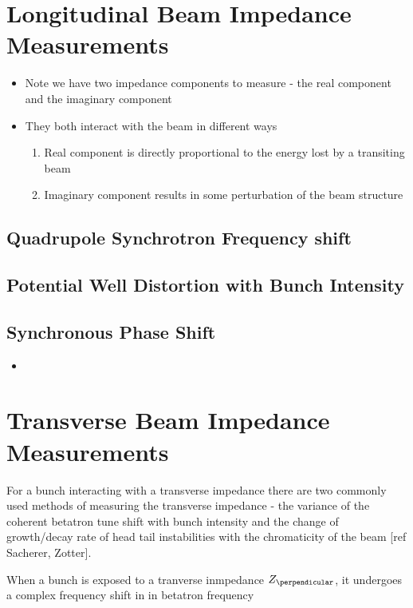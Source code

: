 \section{Longitudinal Beam Impedance Measurements}

\begin{itemize}
\item{Note we have two impedance components to measure - the real component and the imaginary component}
\item{They both interact with the beam in different ways}
\begin{enumerate}
\item{Real component is directly proportional to the energy lost by a transiting beam}
\item{Imaginary component results in some perturbation of the beam structure}
\end{enumerate}
\end{itemize}

\subsection{Quadrupole Synchrotron Frequency shift}

\subsection{Potential Well Distortion with Bunch Intensity}



\subsection{Synchronous Phase Shift}
\begin{itemize}
\item{}
\end{itemize}

\section{Transverse Beam Impedance Measurements}

For a bunch interacting with a transverse impedance there are two commonly used methods of measuring the transverse impedance - the variance of the coherent betatron tune shift with bunch intensity and the change of growth/decay rate of head tail instabilities with the chromaticity of the beam [ref Sacherer, Zotter].

When a bunch is exposed to a tranverse inmpedance $Z_{\perpendicular}$, it undergoes a complex frequency shift in in betatron frequency

